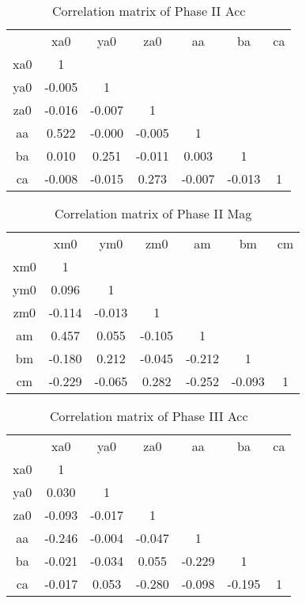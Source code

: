 \begin{table}[H]
    \centering
    \begin{tabular}{c|c|c|c|c|c|c}
             &   xa0  &   ya0  &   za0  &   aa   &   ba   & ca \\
         xa0 &  1     &        &        &        &        &    \\
         ya0 & -0.005 &  1     &        &        &        &    \\
         za0 & -0.016 & -0.007 &  1     &        &        &    \\
         aa  &  0.522 & -0.000 & -0.005 &  1     &        &    \\
         ba  &  0.010 &  0.251 & -0.011 &  0.003 &  1     &    \\
         ca  & -0.008 & -0.015 &  0.273 & -0.007 & -0.013 &  1 \\
    \end{tabular}
    \caption{Correlation matrix of Phase II Acc}
    \label{tab:A:corr_first}
\end{table}

\begin{table}[H]
    \centering
    \begin{tabular}{c|c|c|c|c|c|c}
             &   xm0  & ym0    &   zm0  &   am   &   bm   & cm \\
         xm0 &  1     &        &        &        &        &    \\
         ym0 &  0.096 &  1     &        &        &        &    \\
         zm0 & -0.114 & -0.013 &  1     &        &        &    \\
         am  &  0.457 &  0.055 & -0.105 &  1     &        &    \\
         bm  & -0.180 &  0.212 & -0.045 & -0.212 &  1     &    \\
         cm  & -0.229 & -0.065 &  0.282 & -0.252 & -0.093 & 1  \\
    \end{tabular}
    \caption{Correlation matrix of Phase II Mag}
\end{table}

\begin{table}[H]
    \centering
    \begin{tabular}{c|c|c|c|c|c|c}
             &   xa0  &   ya0  &   za0  &   aa   &   ba   & ca \\
         xa0 &  1     &        &        &        &        &    \\
         ya0 &  0.030 &  1     &        &        &        &    \\
         za0 & -0.093 & -0.017 &  1     &        &        &    \\
         aa  & -0.246 & -0.004 & -0.047 &  1     &        &    \\
         ba  & -0.021 & -0.034 &  0.055 & -0.229 &  1     &    \\
         ca  & -0.017 &  0.053 & -0.280 & -0.098 & -0.195 &  1 \\
    \end{tabular}
    \caption{Correlation matrix of Phase III Acc}
    \label{tab:my_label}
\end{table}

